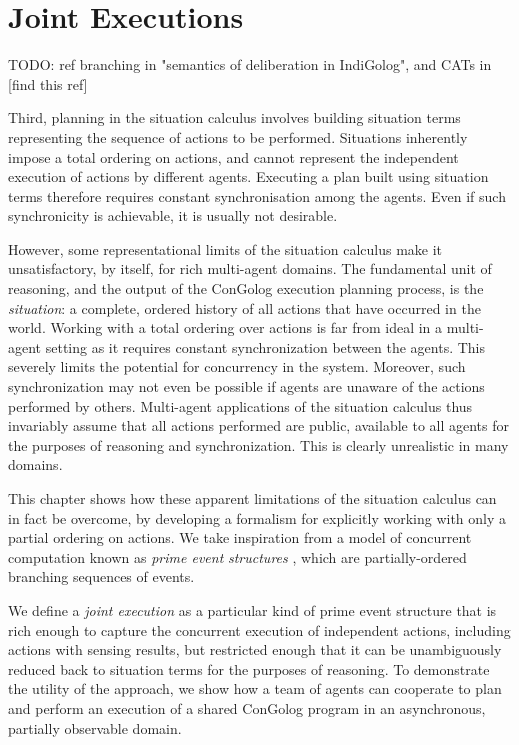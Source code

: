 

\chapter{Joint Executions}

\label{ch:jointexec}

TODO: ref branching in "semantics of deliberation in IndiGolog", and CATs in [find this ref]

Third, planning in the situation calculus involves building situation
terms representing the sequence of actions to be performed. Situations
inherently impose a total ordering on actions, and cannot represent
the independent execution of actions by different agents. Executing
a plan built using situation terms therefore requires constant synchronisation
among the agents. Even if such synchronicity is achievable, it is
usually not desirable.

However, some representational limits of the situation calculus make
it unsatisfactory, by itself, for rich multi-agent domains. The fundamental
unit of reasoning, and the output of the ConGolog execution planning
process, is the \emph{situation}: a complete, ordered history of all
actions that have occurred in the world. Working with a total ordering
over actions is far from ideal in a multi-agent setting as it requires
constant synchronization between the agents. This severely limits
the potential for concurrency in the system. Moreover, such synchronization
may not even be possible if agents are unaware of the actions performed
by others. Multi-agent applications of the situation calculus thus
invariably assume that all actions performed are public, available
to all agents for the purposes of reasoning and synchronization. This
is clearly unrealistic in many domains.

This chapter shows how these apparent limitations of the situation
calculus can in fact be overcome, by developing a formalism for explicitly
working with only a partial ordering on actions. We take inspiration
from a model of concurrent computation known as \emph{prime event}
\emph{structures} \citep{npw79event_structures}, which are partially-ordered
branching sequences of events.

We define a \emph{joint execution} as a particular kind of prime event
structure that is rich enough to capture the concurrent execution
of independent actions, including actions with sensing results, but
restricted enough that it can be unambiguously reduced back to situation
terms for the purposes of reasoning. To demonstrate the utility of
the approach, we show how a team of agents can cooperate to plan and
perform an execution of a shared ConGolog program in an asynchronous,
partially observable domain.

